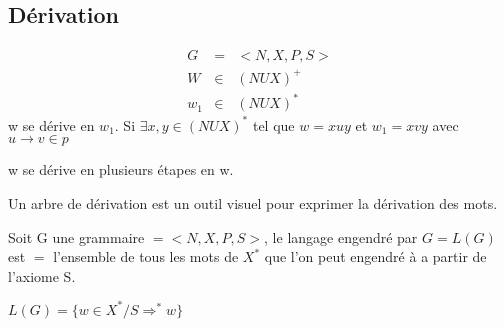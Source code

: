 		\subsection{Dérivation}
			\begin{eqnarray*}
				G &=&  <N,X,P,S>\\
				W &\in& (NUX)^+\\
				w_1&\in& (NUX)^* 
			\end{eqnarray*}
			w se dérive en $w_1$. Si $\exists x, y \in (NUX)^*$ tel que $w=xuy$ et $w_1=xvy$ avec $u\rightarrow v \in p$

			w se dérive en plusieurs étapes en w.
			\begin{definition}
				Un arbre de dérivation est un outil visuel pour exprimer la dérivation des mots.
			\end{definition}
			Soit G une grammaire $= <N,X,P,S>$, le langage engendré par $G=L(G)$ est $=$ l'ensemble de tous les mots de $X^*$ que l'on peut engendré à
			a partir de l'axiome S.

			$L(G) = \{w \in X^*/S\Rightarrow^* w\}$
